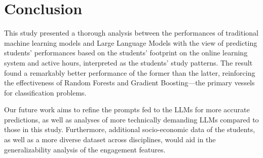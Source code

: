 \section{Conclusion}
This study presented a thorough analysis between the performances of traditional machine learning models and Large Language Models with the view of predicting students' performances based on the students' footprint on the online learning system and active hours, interpreted as the students' study patterns. The result found a remarkably better performance of the former than the latter, reinforcing the effectiveness of Random Forests and Gradient Boosting---the primary vessels for classification problems.

Our future work aims to refine the prompts fed to the LLMs for more accurate predictions, as well as analyses of more technically demanding LLMs compared to those in this study. Furthermore, additional socio-economic data of the students, as well as a more diverse dataset across disciplines, would aid in the generalizability analysis of the engagement features.
